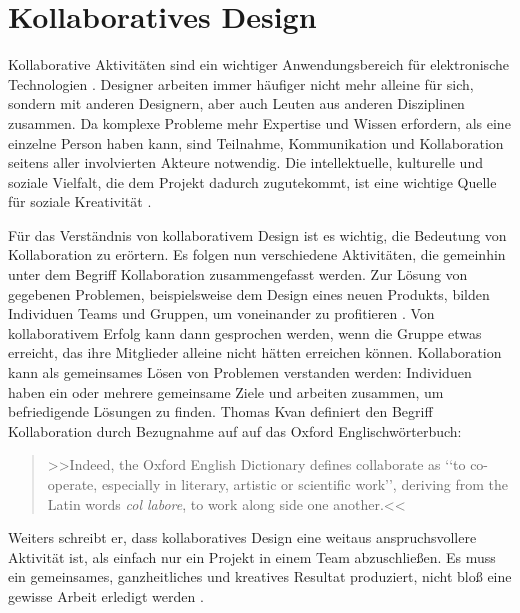 \chapter{Kollaboratives Design}\label{ch:kollaborativesDesign} 

Kollaborative Aktivitäten sind ein wichtiger Anwendungsbereich für elektronische Technologien \citep{Kvan:2000}. Designer arbeiten immer häufiger nicht mehr alleine für sich, sondern mit anderen Designern, aber auch Leuten aus anderen Disziplinen zusammen. Da komplexe Probleme mehr Expertise und Wissen erfordern, als eine einzelne Person haben kann, sind Teilnahme, Kommunikation und Kollaboration seitens aller involvierten Akteure notwendig. Die intellektuelle, kulturelle und soziale Vielfalt, die dem Projekt dadurch zugutekommt, ist eine wichtige Quelle für soziale Kreativität \citep{Fischer:2005}. 

\medskip Für das Verständnis von kollaborativem Design ist es wichtig, die Bedeutung von Kollaboration zu erörtern. Es folgen nun verschiedene Aktivitäten, die gemeinhin unter dem Begriff Kollaboration zusammengefasst werden. Zur Lösung von gegebenen Problemen, beispielsweise dem Design eines neuen Produkts, bilden Individuen Teams und Gruppen, um voneinander zu profitieren \citep{steiner:1972}. Von kollaborativem Erfolg kann dann gesprochen werden, wenn die Gruppe etwas erreicht, das ihre  Mitglieder alleine nicht hätten erreichen können. Kollaboration kann als gemeinsames Lösen von Problemen verstanden werden: Individuen haben ein oder mehrere gemeinsame Ziele und arbeiten zusammen, um befriedigende Lösungen zu finden. Thomas Kvan definiert den Begriff Kollaboration durch Bezugnahme auf auf das Oxford Englischwörterbuch:

\begin{quote} 
	>>Indeed, the Oxford English Dictionary defines collaborate as ‘‘to co-operate, especially in literary, artistic or scientific work’’, deriving from the Latin words \emph{col labore}, to work along side one another.<< \citep{Kvan:2000} 
\end{quote} 

Weiters schreibt er, dass kollaboratives Design eine weitaus anspruchsvollere Aktivität ist, als einfach nur ein Projekt in einem Team abzuschließen. Es muss ein gemeinsames, ganzheitliches und kreatives Resultat produziert, nicht bloß eine gewisse Arbeit erledigt werden \citep{Kvan:2000}.

